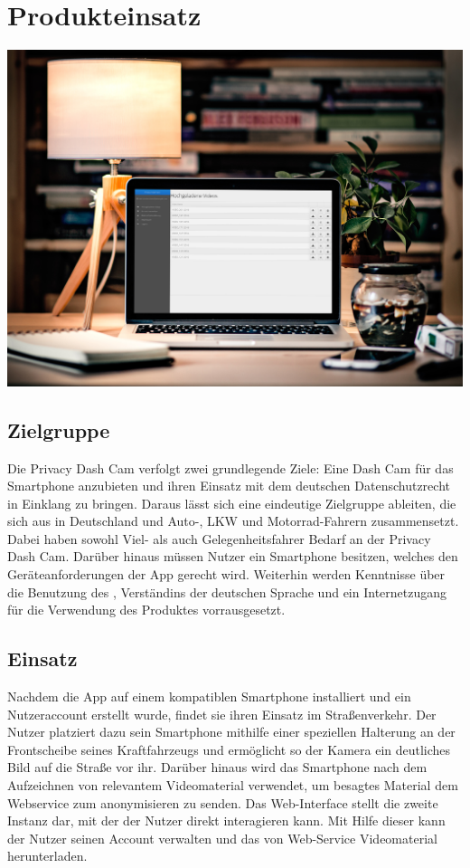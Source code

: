 \chapter{Produkteinsatz}

\includegraphics[width=\textwidth]{subtopicsFuncspec/Res/Mockups/Webinterface_desktop.jpg}

\section{Zielgruppe}
Die Privacy Dash Cam verfolgt zwei grundlegende Ziele: Eine Dash Cam für das \gls{Smartphone} anzubieten und ihren Einsatz mit dem deutschen Datenschutzrecht in Einklang zu bringen. Daraus lässt sich eine eindeutige Zielgruppe ableiten, die sich aus in Deutschland und Auto-, LKW und Motorrad-Fahrern zusammensetzt. Dabei haben sowohl Viel- als auch Gelegenheitsfahrer Bedarf an der Privacy Dash Cam. Darüber hinaus müssen Nutzer ein \gls{Smartphone} besitzen, welches den Geräteanforderungen der \gls{App} gerecht wird. Weiterhin werden Kenntnisse über die Benutzung des , Verständins der deutschen Sprache und ein Internetzugang für die Verwendung des Produktes vorrausgesetzt.

\section{Einsatz}
Nachdem die \gls{App} auf einem kompatiblen \gls{Smartphone} installiert und ein Nutzeraccount erstellt wurde, findet sie ihren Einsatz im Straßenverkehr. Der Nutzer platziert dazu sein \gls{Smartphone} mithilfe einer speziellen Halterung an der Frontscheibe seines Kraftfahrzeugs und ermöglicht so der Kamera ein deutliches Bild auf die Straße vor ihr. Darüber hinaus wird das \gls{Smartphone} nach dem Aufzeichnen von relevantem Videomaterial verwendet, um besagtes Material dem Webservice zum \gls{anonymisieren} zu senden.\newline
Das Web-Interface stellt die zweite Instanz dar, mit der der Nutzer direkt interagieren kann. Mit Hilfe dieser kann der Nutzer seinen Account verwalten und das von Web-Service  Videomaterial herunterladen.


